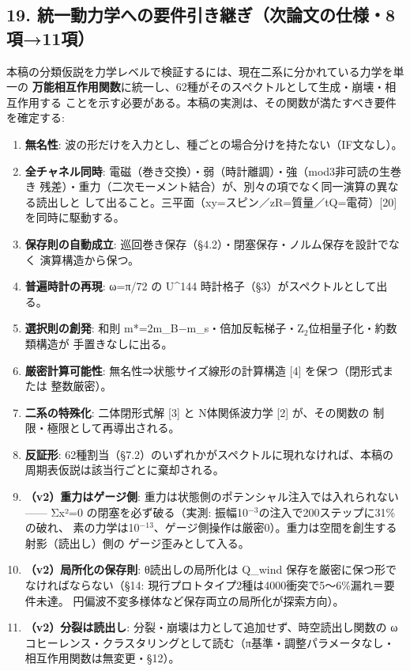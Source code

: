 \documentclass[
]{ltjarticle}
\providecommand{\tightlist}{%
  \setlength{\itemsep}{0pt}\setlength{\parskip}{0pt}}
\begin{document}
\subsection{19.
統一動力学への要件引き継ぎ（次論文の仕様・8項→11項）}\label{ux7d71ux4e00ux52d5ux529bux5b66ux3078ux306eux8981ux4ef6ux5f15ux304dux7d99ux304eux6b21ux8ad6ux6587ux306eux4ed5ux69d88ux980511ux9805}

本稿の分類仮説を力学レベルで検証するには、現在二系に分かれている力学を単一の
\textbf{万能相互作用関数}に統一し、62種がそのスペクトルとして生成・崩壊・相互作用する
ことを示す必要がある。本稿の実測は、その関数が満たすべき要件を確定する:

\begin{enumerate}
\def\labelenumi{\arabic{enumi}.}
\tightlist
\item
  \textbf{無名性}:
  波の形だけを入力とし、種ごとの場合分けを持たない（IF文なし）。
\item
  \textbf{全チャネル同時}:
  電磁（巻き交換）・弱（時計離調）・強（mod3非可読の生巻き
  残差）・重力（二次モーメント結合）が、別々の項でなく同一演算の異なる読出しと
  して出ること。三平面（xy=スピン／zR=質量／tQ=電荷）{[}20{]}
  を同時に駆動する。
\item
  \textbf{保存則の自動成立}:
  巡回巻き保存（§4.2）・閉塞保存・ノルム保存を設計でなく
  演算構造から保つ。
\item
  \textbf{普遍時計の再現}: ω=π/72 の U\^{}144
  時計格子（§3）がスペクトルとして出る。
\item
  \textbf{選択則の創発}: 和則
  m*=2m\_B−m\_s・倍加反転梯子・Z\(_{2}\)位相量子化・約数類構造が
  手置きなしに出る。
\item
  \textbf{厳密計算可能性}: 無名性⇒状態サイズ線形の計算構造 {[}4{]}
  を保つ（閉形式または 整数厳密）。
\item
  \textbf{二系の特殊化}: 二体閉形式解 {[}3{]} と N体関係波力学 {[}2{]}
  が、その関数の 制限・極限として再導出される。
\item
  \textbf{反証形}:
  62種割当（§7.2）のいずれかがスペクトルに現れなければ、本稿の
  周期表仮説は該当行ごとに棄却される。
\item
  \textbf{（v2）重力はゲージ側}:
  重力は状態側のポテンシャル注入では入れられない------ Σx²=0
  の閉塞を必ず破る（実測:
  振幅10\(^{-3}\)の注入で200ステップに31\%の破れ、
  素の力学は10\(^{-13}\)、ゲージ側操作は厳密0）。重力は空間を創生する射影（読出し）側の
  ゲージ歪みとして入る。
\item
  \textbf{（v2）局所化の保存則}: θ読出しの局所化は Q\_wind
  保存を厳密に保つ形で なければならない（§14:
  現行プロトタイプ2種は4000衝突で5〜6\%漏れ＝要件未達。
  円偏波不変多様体など保存両立の局所化が探索方向）。
\item
  \textbf{（v2）分裂は読出し}:
  分裂・崩壊は力として追加せず、時空読出し関数の
  ωコヒーレンス・クラスタリングとして読む（π基準・調整パラメータなし・
  相互作用関数は無変更・§12）。
\end{enumerate}
\end{document}
